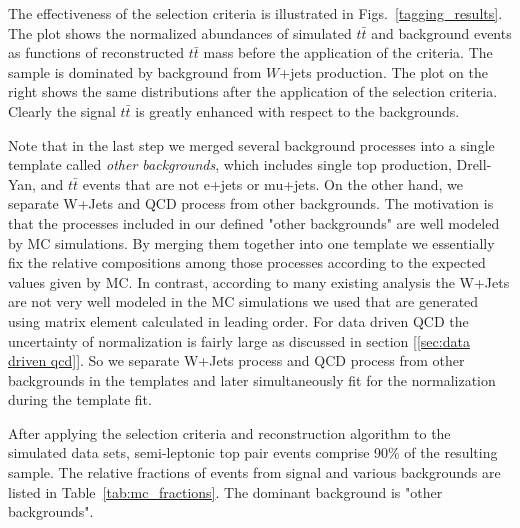 The effectiveness of the selection criteria is illustrated in Figs.~\ref{tagging_results}.  The plot shows the normalized abundances of simulated $t\bar t$ and background events as functions of reconstructed $t\bar t$ mass before the application of the criteria.  The sample is dominated by background from $W$+jets production.  The plot on the right shows the same distributions after the application of the selection criteria.  Clearly the signal $t\bar{t}$ is greatly enhanced with respect to the backgrounds.   

Note that in the last step we merged several background processes into a single template called {\it other backgrounds}, which includes single top production, Drell-Yan, and $t\bar{t}$ events that are not e+jets or mu+jets.  On the other hand, we separate W+Jets and QCD process from other backgrounds. The motivation is that the processes included in our defined "other backgrounds" are well modeled by MC simulations. By merging them together into one template we essentially fix the relative compositions among those processes according to the expected values given by MC.  In contrast, according to many existing analysis the W+Jets are not very well modeled in the MC simulations we used that are generated using matrix element calculated in leading order. For data driven QCD the uncertainty of normalization is fairly large as discussed in section [\ref{sec:data driven qcd}].  So we separate W+Jets process and QCD process from other backgrounds in the templates and later simultaneously fit for the normalization during the template fit.

After applying the selection criteria and reconstruction algorithm to the simulated data sets, semi-leptonic top pair events comprise 90\% of the resulting sample. The relative fractions of events from signal and various backgrounds are listed in Table~\ref{tab:mc_fractions}. The dominant background is "other backgrounds". 


